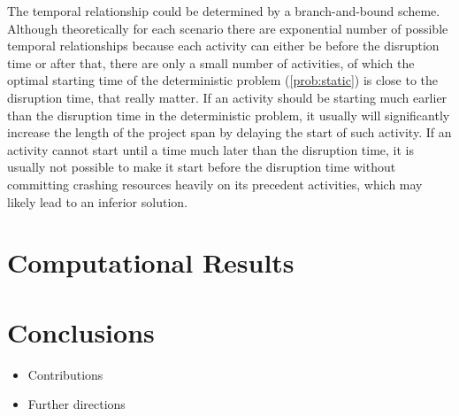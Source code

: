 \documentclass[11pt]{article}
\newcommand{\noi}{\noindent}
\begin{document}
	\noi The temporal relationship could be determined by a branch-and-bound scheme. Although theoretically for each scenario there are exponential number of possible temporal relationships because each activity can either be before the disruption time or after that, there are only a small number of activities, of which the optimal starting time of the deterministic problem (\ref{prob:static}) is close to the disruption time, that really matter. If an activity should be starting much earlier than the disruption time in the deterministic problem, it usually will significantly increase the length of the project span by delaying the start of such activity. If an activity cannot start until a time much later than the disruption time, it is usually not possible to make it start before the disruption time without committing crashing resources heavily on its precedent activities, which may likely lead to an inferior solution.

\section{Computational Results} \label{sec:results}

\section{Conclusions} \label{sec:conclusions}
	\begin{itemize}
		\item Contributions
		\item Further directions
	\end{itemize}



\end{document}

